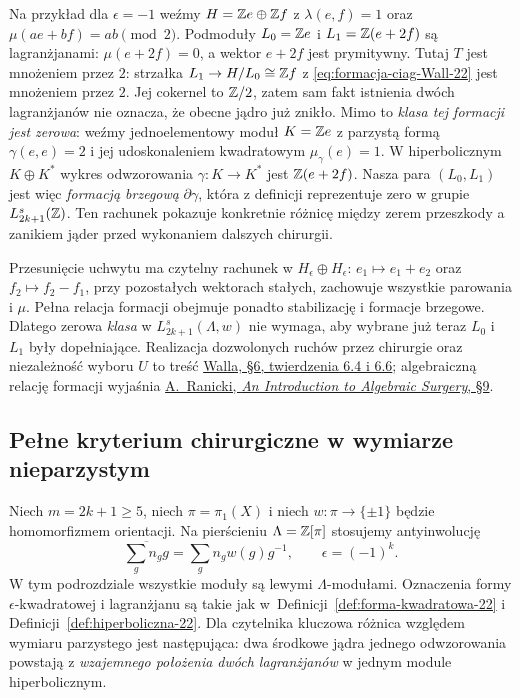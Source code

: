 Na przykład dla $\epsilon=-1$ weźmy
$H=\mathbb{Z} e\oplus\mathbb{Z} f$ z
$\lambda(e,f)=1$ oraz
$\mu(ae+bf)=ab\pmod2$.
Podmoduły $L_0=\mathbb{Z} e$ i
$L_1=\mathbb{Z}(e+2f)$ są lagranżjanami:
$\mu(e+2f)=0$, a wektor $e+2f$
jest prymitywny. Tutaj $T$ jest
mnożeniem przez $2$: strzałka
$L_1\to H/L_0\cong\mathbb{Z} f$ z
\eqref{eq:formacja-ciag-Wall-22} jest
mnożeniem przez $2$. Jej cokernel to
$\mathbb{Z}/2$, zatem sam fakt istnienia dwóch
lagranżjanów nie oznacza, że obecne
jądro już znikło. Mimo to \emph{klasa tej
formacji jest zerowa}: weźmy jednoelementowy
moduł $K=\mathbb{Z} e$ z parzystą formą
$\gamma(e,e)=2$ i jej udoskonaleniem
kwadratowym $\mu_\gamma(e)=1$.
W hiperbolicznym $K\oplus K^*$ wykres
odwzorowania $\gamma:K\to K^*$ jest
$\mathbb{Z}(e+2f)$. Nasza para $(L_0,L_1)$ jest więc
\emph{formacją brzegową} $\partial\gamma$,
która z definicji reprezentuje zero w grupie
$L^s_{2k+1}(\mathbb{Z})$. Ten rachunek pokazuje
konkretnie różnicę między zerem przeszkody
a zanikiem jąder przed wykonaniem dalszych
chirurgii.

Przesunięcie uchwytu ma czytelny rachunek
w $H_\epsilon\oplus H_\epsilon$:
$e_1\mapsto e_1+e_2$ oraz
$f_2\mapsto f_2-f_1$, przy pozostałych
wektorach stałych, zachowuje wszystkie
parowania i $\mu$. Pełna relacja formacji
obejmuje ponadto stabilizację i formacje
brzegowe. Dlatego zerowa \emph{klasa} w
$L^s_{2k+1}(\Lambda,w)$ nie wymaga, aby
wybrane już teraz $L_0$ i $L_1$ były
dopełniające. Realizacja dozwolonych
ruchów przez chirurgie oraz niezależność
wyboru $U$ to treść
\href{https://webhomes.maths.ed.ac.uk/~v1ranick/books/scm.pdf}
{Walla, §6, twierdzenia 6.4 i 6.6};
algebraiczną relację formacji wyjaśnia
\href{https://www.maths.ed.ac.uk/~v1ranick/papers/ranicki.pdf}
{A.\ Ranicki, \emph{An Introduction to Algebraic Surgery}, §9}.

\subsection*{Pełne kryterium chirurgiczne w wymiarze nieparzystym}

Niech $m=2k+1\geq5$, niech
$\pi=\pi_1(X)$ i niech $w:\pi\to\{\pm1\}$ będzie
homomorfizmem orientacji. Na pierścieniu
$\Lambda=\mathbb{Z}[\pi]$ stosujemy antyinwolucję
\[
 \overline{\sum_g n_g g}=\sum_g n_g w(g)g^{-1},
 \qquad \epsilon=(-1)^k.
\]
W tym podrozdziale wszystkie moduły są lewymi
$\Lambda$-modułami. Oznaczenia formy
$\epsilon$-kwadratowej i lagranżjanu są takie jak
w~Definicji~\ref{def:forma-kwadratowa-22} i
Definicji~\ref{def:hiperboliczna-22}. Dla czytelnika
kluczowa różnica względem wymiaru parzystego jest
następująca: dwa środkowe jądra jednego odwzorowania
powstają z \emph{wzajemnego położenia dwóch
lagranżjanów} w jednym module hiperbolicznym.


